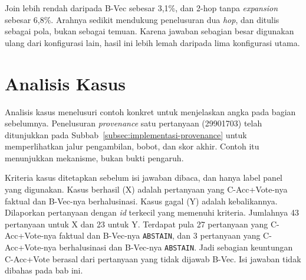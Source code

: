 Join lebih rendah daripada B-Vec sebesar 3,1\%, dan 2-hop tanpa \emph{expansion} sebesar 6,8\%. Arahnya sedikit mendukung penelusuran dua \emph{hop}, dan ditulis sebagai pola, bukan sebagai temuan. Karena jawaban sebagian besar digunakan ulang dari konfigurasi lain, hasil ini lebih lemah daripada lima konfigurasi utama.

\section{Analisis Kasus}
\label{sec:analisis-kasus}

Analisis kasus menelusuri contoh konkret untuk menjelaskan angka pada bagian sebelumnya. Penelusuran \emph{provenance} satu pertanyaan (29901703) telah ditunjukkan pada Subbab~\ref{subsec:implementasi-provenance} untuk memperlihatkan jalur pengambilan, bobot, dan skor akhir. Contoh itu menunjukkan mekanisme, bukan bukti pengaruh.

Kriteria kasus ditetapkan sebelum isi jawaban dibaca, dan hanya label panel yang digunakan. Kasus berhasil (X) adalah pertanyaan yang C-Acc+Vote-nya faktual dan B-Vec-nya berhalusinasi. Kasus gagal (Y) adalah kebalikannya. Dilaporkan pertanyaan dengan \emph{id} terkecil yang memenuhi kriteria. Jumlahnya 43 pertanyaan untuk X dan 23 untuk Y. Terdapat pula 27 pertanyaan yang C-Acc+Vote-nya faktual dan B-Vec-nya \texttt{ABSTAIN}, dan 3 pertanyaan yang C-Acc+Vote-nya berhalusinasi dan B-Vec-nya \texttt{ABSTAIN}. Jadi sebagian keuntungan C-Acc+Vote berasal dari pertanyaan yang tidak dijawab B-Vec. Isi jawaban tidak dibahas pada bab ini.

